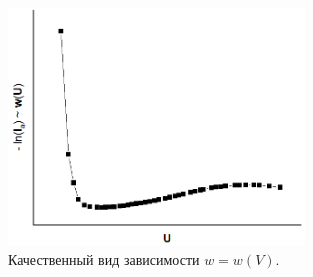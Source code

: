 \documentclass[a4paper,12pt]{article}
\begin{document}
\begin{figure}
\includegraphics[width = 0.7\textwidth]{5.png}
\centering
\caption{Качественный вид зависимости $w = w(V)$.}
\end{figure}
\end{document}
